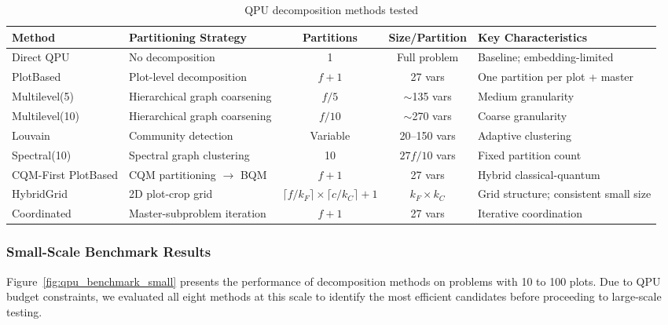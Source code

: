 \documentclass{oqireport}
\begin{document}
\begin{table}[H]
\centering
\caption{QPU decomposition methods tested}
\label{tab:decomposition_methods}
\begin{adjustbox}{max width=\textwidth}
\small
\begin{tabular}{llccp{5cm}}
\toprule
\textbf{Method} & \textbf{Partitioning Strategy} & \textbf{Partitions} & \textbf{Size/Partition} & \textbf{Key Characteristics} \\
\midrule
Direct QPU & No decomposition & 1 & Full problem & Baseline; embedding-limited \\

PlotBased & Plot-level decomposition & $f + 1$ & 27 vars & One partition per plot + master \\

Multilevel(5) & Hierarchical graph coarsening & $f/5$ & $\sim$135 vars & Medium granularity \\

Multilevel(10) & Hierarchical graph coarsening & $f/10$ & $\sim$270 vars & Coarse granularity \\

Louvain & Community detection & Variable & 20--150 vars & Adaptive clustering \\

Spectral(10) & Spectral graph clustering & 10 & $27f/10$ vars & Fixed partition count \\

CQM-First PlotBased & CQM partitioning $\to$ BQM & $f + 1$ & 27 vars & Hybrid classical-quantum \\

HybridGrid & 2D plot-crop grid & $\lceil f/k_F \rceil \times \lceil c/k_C \rceil + 1$ & $k_F \times k_C$ & Grid structure; consistent small size \\

Coordinated & Master-subproblem iteration & $f + 1$ & 27 vars & Iterative coordination \\
\bottomrule
\end{tabular}
\end{adjustbox}
\end{table}

\subsubsection{Small-Scale Benchmark Results}

Figure~\ref{fig:qpu_benchmark_small} presents the performance of decomposition methods on problems with 10 to 100 plots. Due to QPU budget constraints, we evaluated all eight methods at this scale to identify the most efficient candidates before proceeding to large-scale testing.
\end{document}
